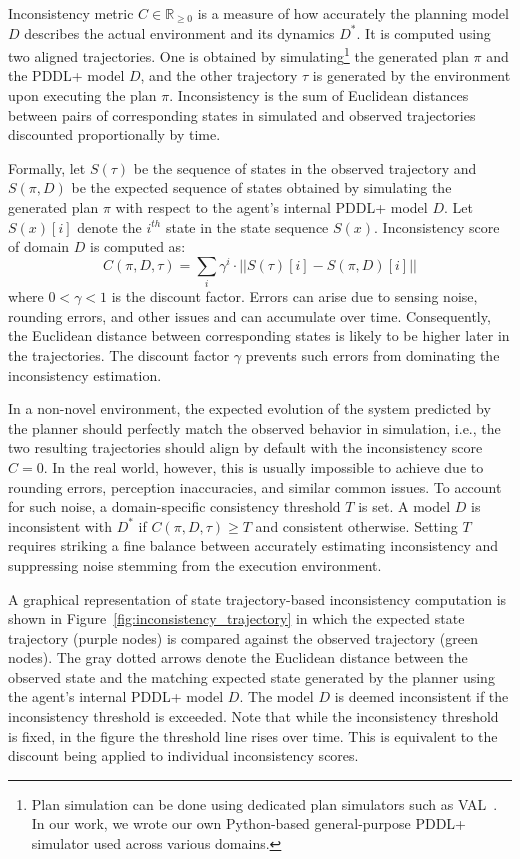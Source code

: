 \documentclass[letterpaper]{article} %
\begin{document}
Inconsistency metric $C \in \mathbb{R}_{\ge 0}$ is a measure of how accurately the planning model $D$ describes the actual environment and its dynamics $D^*$. It is computed using two aligned trajectories. One is obtained by simulating\footnote{Plan simulation can be done using dedicated plan simulators such as VAL~\cite{howey2004val}. In our work, we wrote our own Python-based general-purpose PDDL+ simulator used across various domains.} the generated plan $\pi$ and the PDDL+ model $D$, and the other trajectory $\tau$ is generated by the environment upon executing the plan $\pi$. Inconsistency is the sum of Euclidean distances between pairs of corresponding states in simulated and observed trajectories discounted proportionally by time.


Formally, let $S(\tau)$ be the sequence of states in the observed trajectory and $S(\pi,D)$ be the expected sequence of states obtained by simulating the generated plan $\pi$ with respect to the agent's internal PDDL+ model $D$. Let $S(x)[i]$ denote the $i^{th}$ state in the state sequence $S(x)$. Inconsistency score of domain $D$ is computed as:
\begin{equation}
C(\pi, D, \tau) = \sum_{i} \gamma^i\cdot ||S(\tau)[i] - S(\pi,D)[i]||
\end{equation}
where $0<\gamma<1$ is the discount factor. Errors can arise due to sensing noise, rounding errors, and other issues and can accumulate over time. Consequently, the Euclidean distance between corresponding states is likely to be higher later in the trajectories. The discount factor $\gamma$ prevents such errors from dominating the inconsistency estimation.






In a non-novel environment, the expected evolution of the system predicted by the planner should perfectly match the observed behavior in simulation, i.e., the two resulting trajectories should align by default with the inconsistency score $C=0$. In the real world, however, this is usually impossible to achieve due to rounding errors, perception inaccuracies, and similar common issues. To account for such noise, a domain-specific consistency threshold $T$ is set. A model $D$ is inconsistent with $D^*$ if $C(\pi, D, \tau) \ge T$ and consistent otherwise. Setting $T$ requires striking a fine balance between accurately estimating inconsistency and suppressing noise stemming from the execution environment.


A graphical representation of state trajectory-based inconsistency computation is shown in Figure~\ref{fig:inconsistency_trajectory} in which the expected state trajectory (purple nodes) is compared against the observed trajectory (green nodes). The gray dotted arrows denote the Euclidean distance between the observed state and the matching expected state generated by the planner using the agent's internal PDDL+ model $D$. The model $D$ is deemed inconsistent if the inconsistency threshold is exceeded. Note that while the inconsistency threshold is fixed, in the figure the threshold line rises over time. This is equivalent to the discount being applied to individual inconsistency scores.
\end{document}
